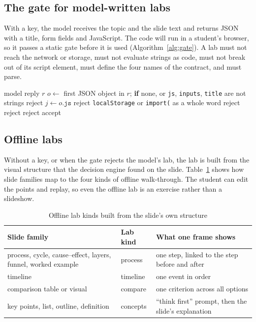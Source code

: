 \documentclass[runningheads]{llncs}
\begin{document}
\subsection{The gate for model-written labs}
With a key, the model receives the topic and the slide text and returns JSON with a title, form fields and JavaScript. The code
will run in a student's browser, so it passes a static gate before it is used (Algorithm~\ref{alg:gate}). A lab must not reach
the network or storage, must not evaluate strings as code, must not break out of its script element, must define the four
names of the contract, and must parse.

\begin{algorithm}[H]
\caption{Gate for model-written lab code}
\label{alg:gate}
\begin{algorithmic}[1]
\Require model reply $r$
\State $o \gets$ first JSON object in $r$; \textbf{if} none, or \texttt{js}, \texttt{inputs}, \texttt{title} are not strings \Return reject
\State $j \gets o.\texttt{js}$
 \Return reject \EndIf
{}
 \State \hspace{1em}\texttt{localStorage} or \texttt{import(} as a whole word \Return reject
\EndIf
{} \Return reject \EndIf
{} \Return reject \EndIf
\State \Return accept
\end{algorithmic}
\end{algorithm}

\subsection{Offline labs}
Without a key, or when the gate rejects the model's lab, the lab is built from the visual structure that the decision engine
found on the slide. Table~\ref{tab:offline} shows how slide families map to the four kinds of offline walk-through. The student
can edit the points and replay, so even the offline lab is an exercise rather than a slideshow.

\begin{table}[H]
\centering
\caption{Offline lab kinds built from the slide's own structure}
\label{tab:offline}
\begin{tabular}{p{4.4cm}p{1.8cm}p{5.2cm}}
\toprule
Slide family & Lab kind & What one frame shows \\
\midrule
process, cycle, cause--effect, layers, funnel, worked example & process & one step, linked to the step before and after \\
timeline & timeline & one event in order \\
comparison table or visual & compare & one criterion across all options \\
key points, list, outline, definition & concepts & ``think first'' prompt, then the slide's explanation \\
\bottomrule
\end{tabular}
\end{table}
\end{document}
